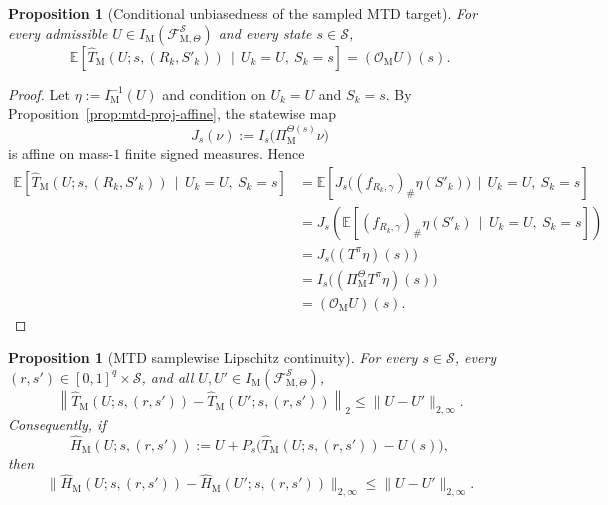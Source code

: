\documentclass{article}
\newtheorem{proposition}[theorem]{Proposition}
\newcommand{\X}{\mathcal{S}}
\begin{document}
\begin{proposition}[Conditional unbiasedness of the sampled MTD target]
\label{prop:mtd-unbiased}
For every admissible $U\in I_{\mathrm M}(\mathcal F^{\X}_{\mathrm M,\Theta})$ and every state $s\in \X$,
\begin{equation}
\mathbb E\left[ \widehat T_{\mathrm M}(U;s,(R_k,S'_k)) \,\mid\, U_k=U,\ S_k=s \right] = (\mathcal O_{\mathrm M}U)(s).
\end{equation}
\end{proposition}

\begin{proof}
Let $\eta:=I_{\mathrm M}^{-1}(U)$ and condition on $U_k=U$ and $S_k=s$. By Proposition~\ref{prop:mtd-proj-affine}, the statewise map
\begin{equation}
J_s(\nu):=I_s\bigl(\Pi_{\mathrm M}^{\Theta(s)}\nu\bigr)
\end{equation}
is affine on mass-$1$ finite signed measures. Hence
\begin{equation}
\begin{aligned}
\mathbb E\left[ \widehat T_{\mathrm M}(U;s,(R_k,S'_k)) \,\mid\, U_k=U,\ S_k=s \right] &= \mathbb E\left[ J_s\bigl((f_{R_k,\gamma})_\#\eta(S'_k)\bigr) \,\mid\, U_k=U,\ S_k=s \right] \\ 
&= J_s\left( \mathbb E\left[ (f_{R_k,\gamma})_\#\eta(S'_k) \,\mid\, U_k=U,\ S_k=s \right] \right)\\ 
&= J_s\bigl((T^\pi\eta)(s)\bigr)\\ 
&= I_s\bigl((\Pi_{\mathrm M}^{\Theta}T^\pi\eta)(s)\bigr)\\ 
&= (\mathcal O_{\mathrm M}U)(s).
\end{aligned}
\end{equation}
\end{proof}

\begin{proposition}[MTD samplewise Lipschitz continuity]
\label{prop:mtd-lipschitz}
For every $s\in \X$, every $(r,s')\in[0,1]^q\times \X$, and all $U,U'\in I_{\mathrm M}(\mathcal F^{\X}_{\mathrm M,\Theta})$,
\begin{equation}
\left\lVert \widehat T_{\mathrm M}(U;s,(r,s')) - \widehat T_{\mathrm M}(U';s,(r,s')) \right\rVert_2 \le \lVert U-U'\rVert_{2,\infty}.
\end{equation}
Consequently, if
\begin{equation}
\widehat H_{\mathrm M}(U;s,(r,s')) := U+P_s\bigl(\widehat T_{\mathrm M}(U;s,(r,s'))-U(s)\bigr),
\end{equation}
then
\begin{equation}
\lVert \widehat H_{\mathrm M}(U;s,(r,s'))-\widehat H_{\mathrm M}(U';s,(r,s')) \rVert_{2,\infty} \le \lVert U-U'\rVert_{2,\infty}.
\end{equation}
\end{proposition}
\end{document}
